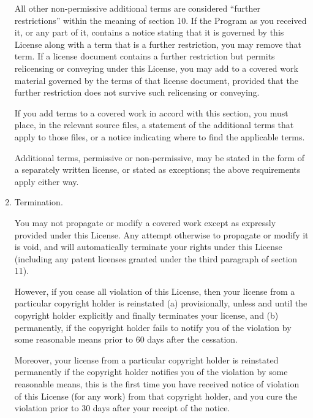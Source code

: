\documentclass[11pt]{article}
\begin{document}
\begin{enumerate}
          All other non-permissive additional terms are considered ``further
          restrictions'' within the meaning of section 10.  If the Program as you
          received it, or any part of it, contains a notice stating that it is
          governed by this License along with a term that is a further
          restriction, you may remove that term.  If a license document contains
          a further restriction but permits relicensing or conveying under this
          License, you may add to a covered work material governed by the terms
          of that license document, provided that the further restriction does
          not survive such relicensing or conveying.

          If you add terms to a covered work in accord with this section, you
          must place, in the relevant source files, a statement of the
          additional terms that apply to those files, or a notice indicating
          where to find the applicable terms.

          Additional terms, permissive or non-permissive, may be stated in the
          form of a separately written license, or stated as exceptions;
          the above requirements apply either way.

    \item Termination.

          You may not propagate or modify a covered work except as expressly
          provided under this License.  Any attempt otherwise to propagate or
          modify it is void, and will automatically terminate your rights under
          this License (including any patent licenses granted under the third
          paragraph of section 11).

          However, if you cease all violation of this License, then your
          license from a particular copyright holder is reinstated (a)
          provisionally, unless and until the copyright holder explicitly and
          finally terminates your license, and (b) permanently, if the copyright
          holder fails to notify you of the violation by some reasonable means
          prior to 60 days after the cessation.

          Moreover, your license from a particular copyright holder is
          reinstated permanently if the copyright holder notifies you of the
          violation by some reasonable means, this is the first time you have
          received notice of violation of this License (for any work) from that
          copyright holder, and you cure the violation prior to 30 days after
          your receipt of the notice.


\end{enumerate}
\end{document}
